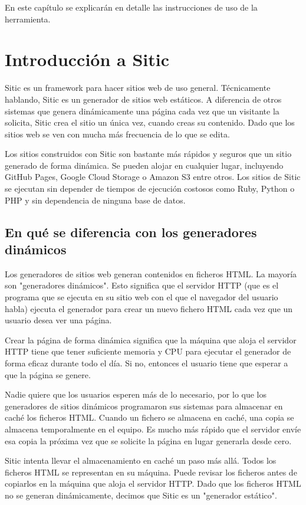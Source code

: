 En este capítulo se explicarán en detalle las instrucciones de uso de la herramienta.

\section{Introducción a Sitic}

Sitic es un framework para hacer sitios web de uso general. Técnicamente hablando, Sitic es un generador de sitios web estáticos.
A diferencia de otros sistemas que genera dinámicamente una página cada vez que un visitante la solicita, Sitic crea el sitio
un única vez, 
cuando creas su contenido. Dado que los sitios web se ven con mucha más frecuencia de lo que se edita.

Los sitios construidos con Sitic son bastante más rápidos y seguros que un sitio generado de forma dinámica.
Se pueden alojar en cualquier lugar, incluyendo GitHub Pages, Google Cloud Storage o Amazon
S3 entre otros. Los sitios de Sitic se ejecutan sin depender de tiempos de ejecución costosos como Ruby, Python
o PHP y sin dependencia de ninguna base de datos.

\subsection{En qué se diferencia con los generadores dinámicos}

Los generadores de sitios web generan contenidos en ficheros HTML. La mayoría son "generadores dinámicos".
Esto significa que el servidor HTTP (que es el programa que se ejecuta en su sitio web con el que el navegador del
usuario habla) ejecuta el generador para crear un nuevo fichero HTML cada vez que un usuario desea ver una página.

Crear la página de forma dinámica significa que la máquina que aloja el servidor HTTP tiene que tener suficiente
memoria y CPU para ejecutar el generador de forma eficaz durante todo el día. Si no, entonces el usuario tiene que
esperar a que la página se genere.

Nadie quiere que los usuarios esperen más de lo necesario, por lo que los generadores de sitios dinámicos programaron
sus sistemas para almacenar en caché los ficheros HTML. Cuando un fichero se almacena en caché, una copia se
almacena temporalmente en el equipo. Es mucho más rápido que el servidor envíe esa copia la próxima vez que
se solicite la página en lugar generarla desde cero.

Sitic intenta llevar el almacenamiento en caché un paso más allá. Todos los ficheros HTML se representan en su máquina.
Puede revisar los ficheros antes de copiarlos en la máquina que aloja el servidor HTTP. Dado que los ficheros HTML
no se generan dinámicamente, decimos que Sitic es un "generador estático".

